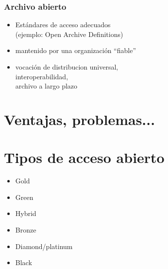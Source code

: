 \documentclass[17pt,aspectratio=169]{beamer}
\begin{document}

\begin{frame}
\frametitle{Archivo abierto}

\begin{itemize}
\item Estándares de acceso adecuados \\
  (ejemplo: Open Archive Definitions)
\item mantenido por una organización ``fiable''
\item vocación de distribucion universal, \\
  interoperabilidad, \\
  archivo a largo plazo
\end{itemize}

\end{frame}

\section{Ventajas, problemas...}


\section{Tipos de acceso abierto}

\begin{frame}

\begin{itemize}
\item Gold
\item Green
\item Hybrid
\item Bronze
\item Diamond/platinum
\item Black
\end{itemize}

\end{frame}
\end{document}
